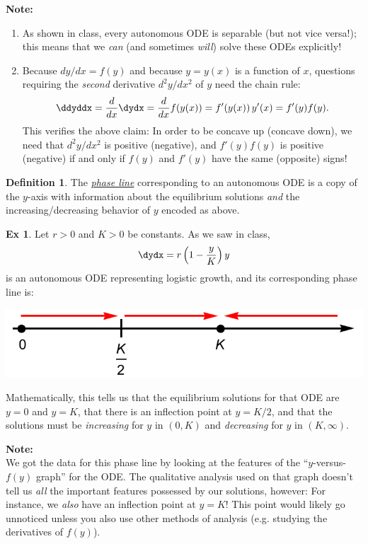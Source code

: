\documentclass[12pt]{article}
\theoremstyle{definition}
\newtheorem{defn}{Definition}
\theoremstyle{underl}
\newtheorem*{ex}{Ex}
\newcommand{\notebox}[2]
{\begin{tcolorbox}[
		enhanced,
		colback=white,
		colframe=black,
		boxrule=0.5pt,
		arc=0pt,
		top=3mm,
		bottom=3mm, 
		grow to left by=-0.5in,
		grow to right by=-0.5in
	]
	\noindent\textbf{#1}\\
	{#2}
\end{tcolorbox}}
\begin{document}
	\notebox{Note:}
	{\vspace{-7.5mm}
		\begin{enumerate}
			\item As shown in class, every autonomous ODE is separable (but not vice versa!); this means that we \textit{can} (and sometimes \textit{will}) solve these ODEs explicitly!
			\item Because $\textstyle dy/dx=f(y)$ and because $y=y(x)$ is a function of $x$, questions requiring the \textit{second} derivative $\textstyle d^2y/dx^2$ of $y$ need the chain rule:
			$$\ddyddx=\frac{d}{dx}\dydx=\frac{d}{dx}f(y(x))=f'(y(x))\,y'(x)=f'(y)f(y).$$
			This verifies the above claim: In order to be concave up (concave down), we need that $\textstyle d^2y/dx^2$ is positive (negative), and $f'(y)f(y)$ is positive (negative) if and only if $f(y)$ and $f'(y)$ have the same (opposite) signs!
		\end{enumerate}
	}

	\begin{defn}
		The \ul{\textit{phase line}} corresponding to an autonomous ODE is a copy of the $y$-axis with information about the equilibrium solutions \textit{and} the increasing/decreasing behavior of $y$ encoded as above.
		\begin{adjustwidth}{0.375in}{0.375in}
			\vspace{-6mm}
			\begin{ex}
				Let $r>0$ and $K>0$ be constants. As we saw in class, 
				$$\dydx=r\left(1-\frac{y}{K}\right)y$$ 
				is an autonomous ODE representing logistic growth, and its corresponding phase line is:
				\vspace{6mm}
				\begin{center}
					\includegraphics[scale=0.75]{AutonomousPhaseLine1}
				\end{center}
				\vspace{3mm}
				Mathematically, this tells us that the equilibrium solutions for that ODE are $y=0$ and $y=K$, that there is an inflection point at $y=K/2$, and that the solutions must be \textit{increasing} for $y$ in $(0,K)$ and \textit{decreasing} for $y$ in $(K,\infty)$.
				
				\notebox{Note:}
				{We got the data for this phase line by looking at the features of the ``$y$-versus-$f(y)$ graph'' for the ODE. The qualitative analysis used on that graph doesn't tell us \textit{all} the important features possessed by our solutions, however: For instance, we \textit{also} have an inflection point at $y=K$! This point would likely go unnoticed unless you also use other methods of analysis (e.g. studying the derivatives of $f(y)$).}
			\end{ex}
		\end{adjustwidth}
	\end{defn}
\end{document}
